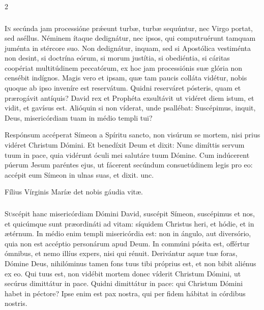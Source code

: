 \documentclass[9pt,twoside]{extarticle}
\begin{document}
\begin{multicols}{2}
\subsubsection*{\center{}}
\lettrine{I}n secúnda jam processióne prǽeunt turbæ, turbæ sequúntur, nec Virgo portat, sed aséllus. Néminem ítaque dedignátur, nec ipsos, qui computruérunt tamquam juménta in stércore suo. Non dedignátur, inquam, sed si Apostólica vestiménta non desint, si doctrína eórum, si morum justítia, si obediéntia, si cáritas coopériat multitúdinem peccatórum, ex hoc jam processiónis suæ glória non censébit indígnos. Magis vero et ipsam, quæ tam paucis colláta vidétur, nobis quoque ab ipso inveníre est reservátum. Quidni reserváret pósteris, quam et prærogávit antíquis? David rex et Prophéta exsultávit ut vidéret diem istum, et vidit, et gavísus est. Alióquin si non víderat, unde psallébat: Suscépimus, inquit, Deus, misericórdiam tuam in médio templi tui?

\begin{tightlist}{}
\item {} Respónsum accéperat Símeon a Spíritu sancto, non visúrum se mortem, nisi prius vidéret Christum Dómini. Et benedíxit Deum et dixit: \textred{*} Nunc dimíttis servum tuum in pace, quia vidérunt óculi mei salutáre tuum Dómine.  Cum indúcerent púerum Jesum paréntes ejus, ut fácerent secúndum consuetúdinem legis pro eo: accépit eum Símeon in ulnas suas, et dixit. unc.
\item {\small {} Fílius Vírginis Maríæ det nobis gáudia vitæ.}
\end{tightlist}

\subsubsection*{\center{}}
\lettrine{S}uscépit hanc misericórdiam Dómini David, suscépit Símeon, suscépimus et nos, et quicúmque sunt præordináti ad vitam: síquidem Christus heri, et hódie, et in ætérnum. In médio enim templi misericórdia est: non in ángulo, aut diversório, quia non est accéptio personárum apud Deum. In commúni pósita est, offértur ómnibus, et nemo illíus expers, nisi qui rénuit. Derivántur aquæ tuæ foras, Dómine Deus, nihilóminus tamen fons tuus tibi próprius est, et non bibit aliénus ex eo. Qui tuus est, non vidébit mortem donec víderit Christum Dómini, ut secúrus dimittátur in pace. Quidni dimittátur in pace: qui Christum Dómini habet in péctore? Ipse enim est pax nostra, qui per fidem hábitat in córdibus nostris.


\end{multicols}
\end{document}
